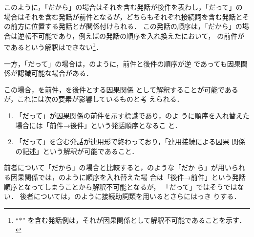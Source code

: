 

このように，「だから」の場合はそれを含む発話が後件を表わし，「だって」の
場合はそれを含む発話が前件となるが，どちらもそれぞれ接続詞を含む発話とそ
の前方に位置する発話とが関係付けられる．
この発話の順序は，「だから」の場合は逆転不可能であり，例えばの発話の順序を入れ換えたにおいて，
の前件がであるという解釈はできない\footnote{ ``$\ast$''
を含む発話例は，それが因果関係として解釈不可能であることを示す．}．


一方，「だって」の場合は，のように，前件と後件の順序が逆
であっても因果関係が認識可能な場合がある．


この場合，を前件，を後件とする因果関係
として解釈することが可能であるが，これには次の要素が影響しているものと考
えられる．

\begin{enumerate}
 \item 「だって」が因果関係の前件を示す標識であり，のよ
       うに順序を入れ替えた場合には「前件→後件」という発話順序となるこ
       と．
 \item 「だって」を含む発話が連用形で終わっており，「連用接続による因果
       関係の記述」という解釈が可能であること．
\end{enumerate}

前者について「だから」の場合と比較すると，のような「だか
ら」が用いられる因果関係では，のように順序を入れ替えた場
合は「後件→前件」という発話順序となってしまうことから解釈不可能となるが，
「だって」ではそうではない．
後者については，のように接続助詞類を用いるとさらにはっき
りする．

